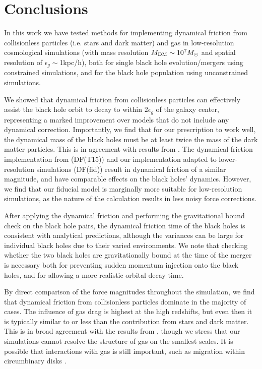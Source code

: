 \section{Conclusions}
\label{sec:conclusion}
In this work we have tested methods for implementing dynamical friction from collisionless particles (i.e. stars and dark matter) and gas in low-resolution cosmological simulations (with mass resolution $M_{\rm DM} \sim 10^7 M_{\odot}$ and spatial resolution of $\epsilon_g \sim$1kpc/h), both for single black hole evolution/mergers using constrained simulations, and for the black hole population using unconstrained simulations.

We showed that dynamical friction from collisionless particles can effectively assist the black hole orbit to decay to within $2\epsilon_g$ of the galaxy center, representing a marked improvement over models that do not include any dynamical correction. Importantly, we find that for our prescription to work well, the dynamical mass of the black holes must be at least twice the mass of the dark matter particles. This is in agreement with results from \cite{Tremmel2015}. The dynamical friction implementation from \cite{Tremmel2015} (DF(T15)) and our implementation adapted to lower-resolution simulations (DF(fid)) result in dynamical friction of a similar magnitude, and have comparable effects on the black holes' dynamics. However, we find that our fiducial model is marginally more suitable for low-resolution simulations, as the nature of the calculation results in less noisy force corrections.

After applying the dynamical friction and performing the gravitational bound check on the black hole pairs, the dynamical friction time of the black holes is consistent with analytical predictions, although the variances can be large for individual black holes due to their varied environments. We note that checking whether the two black holes are gravitationally bound at the time of the merger is necessary both for preventing sudden momentum injection onto the black holes, and for allowing a more realistic orbital decay time.

By direct comparison of the force magnitudes throughout the simulation, we find that dynamical friction from collisionless particles dominate in the majority of cases. The influence of gas drag is highest at the high redshifts, but even then it is typically similar to or less than the contribution from stars and dark matter. This is in broad agreement with the results from \cite{Pfister2019}, though we stress that our simulations cannot resolve the structure of gas on the smallest scales. It is possible that interactions with gas is still important, such as migration within circumbinary disks \citep[e.g.][]{Haiman2009}.

